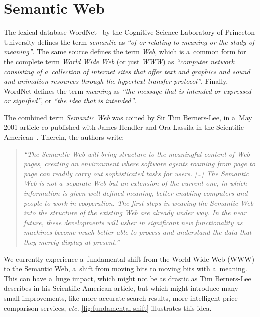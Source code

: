 \section{Semantic Web}
The lexical database
WordNet~\cite{fellbaum1998wordnet,miller1995wordnet}
by the Cognitive Science Laboratory
of Princeton University defines the term \emph{semantic}
as \emph{``of or relating to meaning or the study of meaning''}.
The same source defines the term \emph{Web},
which is a~common form for the complete term
\emph{World Wide Web} (or just \emph{WWW}) as
\emph{``computer network consisting of a~collection of internet sites that offer text and graphics and
sound and animation resources through the hypertext
transfer protocol''}.
Finally, WordNet defines the term \emph{meaning}
as \emph{``the message that is intended or expressed
or signified''}, or \emph{``the idea that is intended''}.

The combined term \emph{Semantic Web} was coined
by Sir Tim Berners-Lee,
in a~May 2001 article co-published with James Hendler
and Ora Lassila
in the Scientific American~\cite{bernerslee2001semanticweb}.
Therein, the authors write: 

\begin{quotation}
\textit{``The Semantic Web will bring structure to the meaningful
content of Web pages,
creating an environment where software agents
roaming from page to page
can readily carry out sophisticated tasks for users. [\ldots]
The Semantic Web is not a~separate Web
but an extension of the current one,
in which information is given well-defined meaning,
better enabling computers and people
to work in cooperation.
The first steps in weaving the Semantic Web
into the structure of the existing Web
are already under way.
In the near future, these developments
will usher in significant new functionality
as machines become much better able to process and \emph{understand} the data
that they merely display at present.''}
\end{quotation}

We currently experience a~fundamental shift
from the World Wide Web (WWW) to the Semantic Web,
a~shift from moving bits to moving bits with a~meaning.
This can have a~huge impact,
which might not be as drastic as Tim Berners-Lee describes
in his Scientific American article,
but which might introduce many small improvements,
like more accurate search results,
more intelligent price comparison services, \emph{etc.}
\autoref{fig:fundamental-shift} illustrates this idea.

